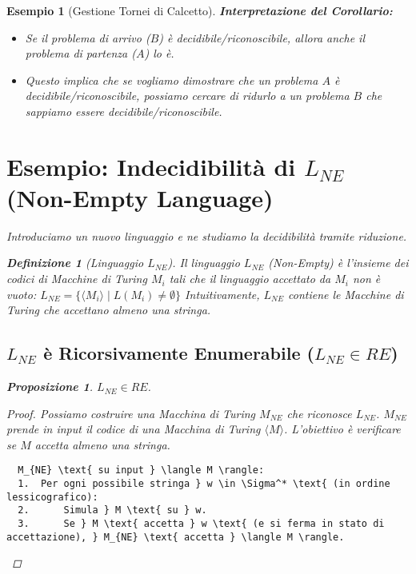 \documentclass[a4paper]{article}
\newtheorem{definition}[theorem]{Definizione}
\newtheorem{example}[theorem]{Esempio}
\newtheorem{proposition}[theorem]{Proposizione}
\begin{document}
\begin{example}[Gestione Tornei di Calcetto]
\textbf{Interpretazione del Corollario:}
\begin{itemize}
    \item Se il problema di arrivo ($B$) è decidibile/riconoscibile, allora anche il problema di partenza ($A$) lo è.
    \item Questo implica che se vogliamo dimostrare che un problema $A$ è decidibile/riconoscibile, possiamo cercare di ridurlo a un problema $B$ che sappiamo essere decidibile/riconoscibile.
\end{itemize}

\section{Esempio: Indecidibilità di $L_{NE}$ (Non-Empty Language)}

Introduciamo un nuovo linguaggio e ne studiamo la decidibilità tramite riduzione.

\begin{definition}[Linguaggio $L_{NE}$]
Il linguaggio $L_{NE}$ (Non-Empty) è l'insieme dei codici di Macchine di Turing $M_i$ tali che il linguaggio accettato da $M_i$ non è vuoto:
$L_{NE} = \{ \langle M_i \rangle \mid L(M_i) \neq \emptyset \}$
Intuitivamente, $L_{NE}$ contiene le Macchine di Turing che accettano almeno una stringa.
\end{definition}

\subsection{$L_{NE}$ è Ricorsivamente Enumerabile ($L_{NE} \in RE$)}

\begin{proposition}
$L_{NE} \in RE$.
\end{proposition}
\begin{proof}
Possiamo costruire una Macchina di Turing $M_{NE}$ che riconosce $L_{NE}$. $M_{NE}$ prende in input il codice di una Macchina di Turing $\langle M \rangle$. L'obiettivo è verificare se $M$ accetta almeno una stringa.

\begin{verbatim}
  M_{NE} \text{ su input } \langle M \rangle:
  1.  Per ogni possibile stringa } w \in \Sigma^* \text{ (in ordine lessicografico):
  2.      Simula } M \text{ su } w.
  3.      Se } M \text{ accetta } w \text{ (e si ferma in stato di accettazione), } M_{NE} \text{ accetta } \langle M \rangle.
\end{verbatim}


\end{proof}
\end{example}
\end{document}
